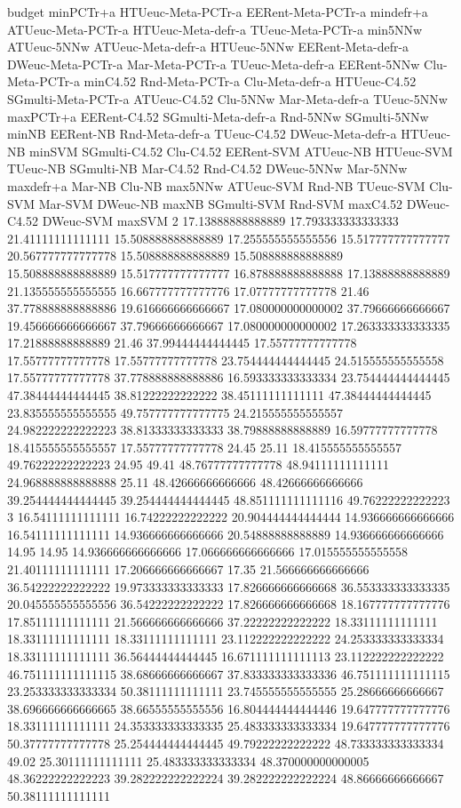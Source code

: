 budget minPCTr+a HTUeuc-Meta-PCTr-a EERent-Meta-PCTr-a mindefr+a ATUeuc-Meta-PCTr-a HTUeuc-Meta-defr-a TUeuc-Meta-PCTr-a min5NNw ATUeuc-5NNw ATUeuc-Meta-defr-a HTUeuc-5NNw EERent-Meta-defr-a DWeuc-Meta-PCTr-a Mar-Meta-PCTr-a TUeuc-Meta-defr-a EERent-5NNw Clu-Meta-PCTr-a minC4.52 Rnd-Meta-PCTr-a Clu-Meta-defr-a HTUeuc-C4.52 SGmulti-Meta-PCTr-a ATUeuc-C4.52 Clu-5NNw Mar-Meta-defr-a TUeuc-5NNw maxPCTr+a EERent-C4.52 SGmulti-Meta-defr-a Rnd-5NNw SGmulti-5NNw minNB EERent-NB Rnd-Meta-defr-a TUeuc-C4.52 DWeuc-Meta-defr-a HTUeuc-NB minSVM SGmulti-C4.52 Clu-C4.52 EERent-SVM ATUeuc-NB HTUeuc-SVM TUeuc-NB SGmulti-NB Mar-C4.52 Rnd-C4.52 DWeuc-5NNw Mar-5NNw maxdefr+a Mar-NB Clu-NB max5NNw ATUeuc-SVM Rnd-NB TUeuc-SVM Clu-SVM Mar-SVM DWeuc-NB maxNB SGmulti-SVM Rnd-SVM maxC4.52 DWeuc-C4.52 DWeuc-SVM maxSVM
2 17.13888888888889 17.793333333333333 21.41111111111111 15.508888888888889 17.255555555555556 15.517777777777777 20.567777777777778 15.508888888888889 15.508888888888889 15.508888888888889 15.517777777777777 16.878888888888888 17.13888888888889 21.135555555555555 16.667777777777776 17.07777777777778 21.46 37.778888888888886 19.616666666666667 17.080000000000002 37.79666666666667 19.456666666666667 37.79666666666667 17.080000000000002 17.263333333333335 17.21888888888889 21.46 37.99444444444445 17.55777777777778 17.55777777777778 17.55777777777778 23.754444444444445 24.515555555555558 17.55777777777778 37.778888888888886 16.593333333333334 23.754444444444445 47.38444444444445 38.81222222222222 38.45111111111111 47.38444444444445 23.835555555555555 49.757777777777775 24.215555555555557 24.982222222222223 38.81333333333333 38.79888888888889 16.59777777777778 18.415555555555557 17.55777777777778 24.45 25.11 18.415555555555557 49.76222222222223 24.95 49.41 48.76777777777778 48.94111111111111 24.968888888888888 25.11 48.42666666666666 48.42666666666666 39.254444444444445 39.254444444444445 48.851111111111116 49.76222222222223
3 16.54111111111111 16.74222222222222 20.904444444444444 14.936666666666666 16.54111111111111 14.936666666666666 20.54888888888889 14.936666666666666 14.95 14.95 14.936666666666666 17.066666666666666 17.015555555555558 21.40111111111111 17.206666666666667 17.35 21.566666666666666 36.54222222222222 19.973333333333333 17.826666666666668 36.553333333333335 20.045555555555556 36.54222222222222 17.826666666666668 18.167777777777776 17.85111111111111 21.566666666666666 37.22222222222222 18.33111111111111 18.33111111111111 18.33111111111111 23.112222222222222 24.253333333333334 18.33111111111111 36.56444444444445 16.671111111111113 23.112222222222222 46.751111111111115 38.68666666666667 37.833333333333336 46.751111111111115 23.253333333333334 50.38111111111111 23.745555555555555 25.28666666666667 38.696666666666665 38.66555555555556 16.804444444444446 19.647777777777776 18.33111111111111 24.353333333333335 25.483333333333334 19.647777777777776 50.37777777777778 25.254444444444445 49.79222222222222 48.733333333333334 49.02 25.30111111111111 25.483333333333334 48.370000000000005 48.36222222222223 39.282222222222224 39.282222222222224 48.86666666666667 50.38111111111111

